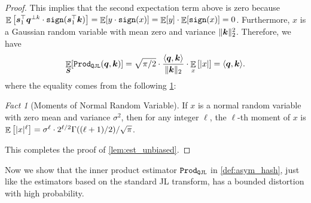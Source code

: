 \documentclass[11pt]{article}
\theoremstyle{plain}
\theoremstyle{definition}
\theoremstyle{remark}
\newcommand{\prodqjl}{\operatorname{{\tt Prod_{QJL}}}}
\newtheorem{fact}[theorem]{Fact}
\begin{document}
\begin{proof}
    This implies that the second expectation term above is zero because $\mathop{{\mathbb{E}}}\left[ {\bm s}_1^\top {\bm q}^{\perp k} \cdot {\tt sign}({\bm s}_1^\top {\bm k})\right] = \mathop{{\mathbb{E}}}[ y \cdot {\tt sign}(x)] = \mathop{{\mathbb{E}}}[ y ] \cdot \mathop{{\mathbb{E}}} [{\tt sign}(x)] = 0$. 
    Furthermore, $x$ is a Gaussian random variable with mean zero and variance $\| {\bm k} \|_2^2$. Therefore, we have
    \begin{align*}
        \E_{\S} [\prodqjl(\q, \k)] = \sqrt{\pi/2} \cdot \frac{\langle \q, \k \rangle}{\|\k\|_2} \cdot \E_x \left[ | x | \right] = \langle \q, \k \rangle.
    \end{align*}
    where the equality comes from the following \cref{moment_normal}:
    \begin{fact}[Moments of Normal Random Variable]\label{moment_normal}
        If $x$ is a normal random variable with zero mean and variance $\sigma^2$, then for any integer $\ell$, the $\ell$-th moment of $x$ is $\mathop{{\mathbb{E}}} \left[ |x|^\ell \right] = \sigma^\ell \cdot 2^{\ell/2} \Gamma((\ell+1)/2) / \sqrt{\pi}$.
    \end{fact}
    This completes the proof of \cref{lem:est_unbiased}.
\end{proof}

Now we show that the inner product estimator $\prodqjl$ in \cref{def:asym_hash}, just like the estimators based on the standard JL transform, has a bounded distortion with high probability.
\end{document}
